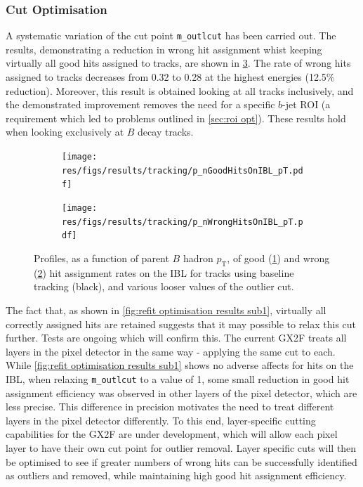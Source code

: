 \subsubsection{Cut Optimisation}\label{sec:cut opt}
A systematic variation of the cut point \texttt{m\_outlcut} has been carried out. The results, demonstrating a reduction in wrong hit assignment whist keeping virtually all good hits assigned to tracks, are shown in \cref{fig:outlier cut scan}. The rate of wrong hits assigned to tracks decreases from 0.32 to 0.28 at the highest energies (12.5\% reduction). Moreover, this result is obtained looking at all tracks inclusively, and the demonstrated improvement removes the need for a specific $b$-jet ROI (a requirement which led to problems outlined in \cref{sec:roi opt}). These results hold when looking exclusively at $B$ decay tracks.
%
\begin{figure}[!htbp]
    \centering
    \begin{subfigure}{.5\textwidth}
      \centering
      \texttt{[image: res/figs/results/tracking/p\_nGoodHitsOnIBL\_pT.pdf]}
      \caption{}
      \label{fig:outlier cut scan sub1}
    \end{subfigure}%
    \begin{subfigure}{.5\textwidth}
      \centering
      \texttt{[image: res/figs/results/tracking/p\_nWrongHitsOnIBL\_pT.pdf]}
      \caption{}
      \label{fig:outlier cut scan sub2}
    \end{subfigure}
    \caption{Profiles, as a function of parent $B$ hadron $p_{\text{T}}$, of good (\cref{fig:outlier cut scan sub1}) and wrong (\cref{fig:outlier cut scan sub2}) hit assignment rates on the IBL for tracks using baseline tracking (black), and various looser values of the outlier cut.}
    \label{fig:outlier cut scan}
\end{figure}
%
The fact that, as shown in \cref{fig:refit optimisation results sub1}, virtually all correctly assigned hits are retained suggests that it may possible to relax this cut further. Tests are ongoing which will confirm this. The current GX2F treats all layers in the pixel detector in the same way - applying the same cut to each. While \cref{fig:refit optimisation results sub1} shows no adverse affects for hits on the IBL, when relaxing \texttt{m\_outlcut} to a value of 1, some small reduction in good hit assignment efficiency was observed in other layers of the pixel detector, which are less precise. This difference in precision motivates the need to treat different layers in the pixel detector differently. To this end, layer-specific cutting capabilities for the GX2F are under development, which will allow each pixel layer to have their own cut point for outlier removal. Layer specific cuts will then be optimised to see if greater numbers of wrong hits can be successfully identified as outliers and removed, while maintaining high good hit assignment efficiency.
